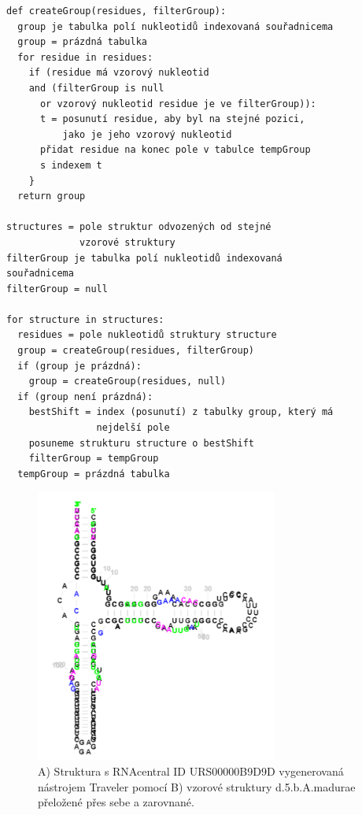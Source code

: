 \begin{lstlisting}[caption={Pseudokód zarovnání struktur},label=pseudo]
def createGroup(residues, filterGroup):
  group je tabulka polí nukleotidů indexovaná souřadnicema
  group = prázdná tabulka 
  for residue in residues:
    if (residue má vzorový nukleotid 
    and (filterGroup is null 
      or vzorový nukleotid residue je ve filterGroup)):
      t = posunutí residue, aby byl na stejné pozici,
          jako je jeho vzorový nukleotid
      přidat residue na konec pole v tabulce tempGroup 
      s indexem t
    }
  return group

structures = pole struktur odvozených od stejné 
             vzorové struktury
filterGroup je tabulka polí nukleotidů indexovaná 
souřadnicema
filterGroup = null

for structure in structures:
  residues = pole nukleotidů struktury structure
  group = createGroup(residues, filterGroup)
  if (group je prázdná):
    group = createGroup(residues, null)
  if (group není prázdná):
    bestShift = index (posunutí) z tabulky group, který má 
                nejdelší pole
    posuneme strukturu structure o bestShift
    filterGroup = tempGroup
  tempGroup = prázdná tabulka
\end{lstlisting}

\begin{figure}[H]
  \centering
  \includegraphics[height=90mm]{../img/kap02/align/alignedAlpha1.png}
  \caption[Vygenerovaná a vzorová struktura vykreslené přes sebe]{A) Struktura
  s RNAcentral ID URS00000B9D9D vygenerovaná nástrojem Traveler pomocí B)
  vzorové struktury d.5.b.A.madurae přeložené přes sebe a zarovnané.}
  \label{zarovnani}
\end{figure}

